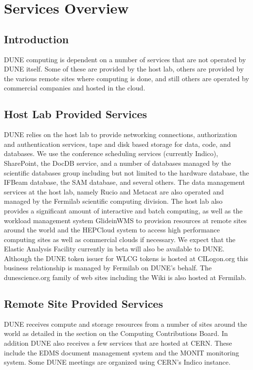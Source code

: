 \documentclass[../main-v1.tex]{subfiles}
\begin{document}
\chapter{Services Overview }
\label{ch:serv}

\section{Introduction}
DUNE computing is dependent on a number of services that are not operated by DUNE itself.
Some of these are provided by the host lab, others are provided by the various remote sites where
computing is done, and still others are operated by commercial companies and hosted in the cloud.


\section{Host Lab Provided Services}
DUNE relies on the host lab to provide networking connections, authorization and authentication services, tape and disk based storage for data, code, and databases.  We use the conference scheduling services (currently Indico), SharePoint, the DocDB service, and a number of databases managed by the scientific databases group including but not limited to the hardware database,
the IFBeam database, the SAM database, and several others.  The data management services at the host lab, namely Rucio and Metacat are also operated and managed by the Fermilab scientific computing division.  
The host lab also provides a significant amount of interactive and batch computing, as well as the workload management
system GlideinWMS to provision resources at remote sites around the world and the HEPCloud system to access high performance computing sites as well as commercial clouds if necessary.
We expect that the Elastic Analysis Facility currently in beta will also be available to DUNE.
Although the DUNE token issuer for WLCG tokens is hosted at CILogon.org this business relationship is managed by Fermilab
on DUNE's behalf.
The dunescience.org family of web sites including the Wiki is also hosted at Fermilab.
\section{Remote Site Provided Services}
DUNE receives compute and storage resources from a number of sites around the world as detailed in the section on the Computing Contributions Board. In addition DUNE also receives a few services that are hosted at CERN.  These include the EDMS document
management system and  the MONIT monitoring system. Some DUNE meetings are organized using CERN's Indico instance.
\end{document}
